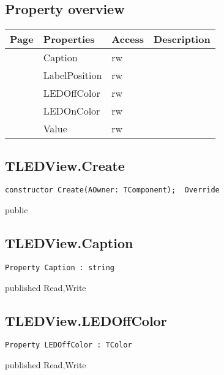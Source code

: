 \subsection{Property overview}
\label{computer:ledview:tledview:properties}
\begin{tabularx}{\textwidth}{lllX}
Page & Properties & Access & Description \\ \hline
\pageref{computer:ledview:tledview:caption} & Caption & rw &  \\
\pageref{computer:ledview:tledview:labelposition} & LabelPosition & rw &  \\
\pageref{computer:ledview:tledview:ledoffcolor} & LEDOffColor & rw &  \\
\pageref{computer:ledview:tledview:ledoncolor} & LEDOnColor & rw &  \\
\pageref{computer:ledview:tledview:value} & Value & rw &  \\
\hline
\end{tabularx}
\subsection{TLEDView.Create}
\label{computer:ledview:tledview:create}
\begin{FPCList}
\Declaration 

\begin{verbatim}
constructor Create(AOwner: TComponent);  Override
\end{verbatim}
\Visibility
public
\end{FPCList}
\subsection{TLEDView.Caption}
\label{computer:ledview:tledview:caption}
\begin{FPCList}
\Declaration 

\begin{verbatim}
Property Caption : string
\end{verbatim}
\Visibility
published
\Access
Read,Write
\end{FPCList}
\subsection{TLEDView.LEDOffColor}
\label{computer:ledview:tledview:ledoffcolor}
\begin{FPCList}
\Declaration 

\begin{verbatim}
Property LEDOffColor : TColor
\end{verbatim}
\Visibility
published
\Access
Read,Write
\end{FPCList}
